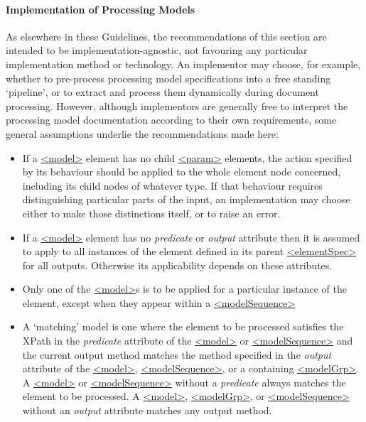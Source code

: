 \paragraph[{Implementation of Processing Models}]{Implementation of Processing Models}\label{TDPMIP}\par
As elsewhere in these Guidelines, the recommendations of this section are intended to be implementation-agnostic, not favouring any particular implementation method or technology. An implementor may choose, for example, whether to pre-process processing model specifications into a free standing ‘pipeline’, or to extract and process them dynamically during document processing. However, although implementors are generally free to interpret the processing model documentation according to their own requirements, some general assumptions underlie the recommendations made here: \begin{itemize}
\item If a \hyperref[TEI.model]{<model>} element has no child \hyperref[TEI.param]{<param>} elements, the action specified by its behaviour should be applied to the whole element node concerned, including its child nodes of whatever type. If that behaviour requires distinguishing particular parts of the input, an implementation may choose either to make those distinctions itself, or to raise an error.
\item If a \hyperref[TEI.model]{<model>} element has no {\itshape predicate} or {\itshape output} attribute then it is assumed to apply to all instances of the element defined in its parent \hyperref[TEI.elementSpec]{<elementSpec>} for all outputs. Otherwise its applicability depends on these attributes.
\item Only one of the \hyperref[TEI.model]{<model>}s is to be applied for a particular instance of the element, except when they appear within a \hyperref[TEI.modelSequence]{<modelSequence>}
\item A ‘matching’ model is one where the element to be processed satisfies the XPath in the {\itshape predicate} attribute of the \hyperref[TEI.model]{<model>} or \hyperref[TEI.modelSequence]{<modelSequence>} and the current output method matches the method specified in the {\itshape output} attribute of the \hyperref[TEI.model]{<model>}, \hyperref[TEI.modelSequence]{<modelSequence>}, or a containing \hyperref[TEI.modelGrp]{<modelGrp>}. A \hyperref[TEI.model]{<model>} or \hyperref[TEI.modelSequence]{<modelSequence>} without a {\itshape predicate} always matches the element to be processed. A \hyperref[TEI.model]{<model>}, \hyperref[TEI.modelGrp]{<modelGrp>}, or \hyperref[TEI.modelSequence]{<modelSequence>} without an {\itshape output} attribute matches any output method.

\end{itemize}
